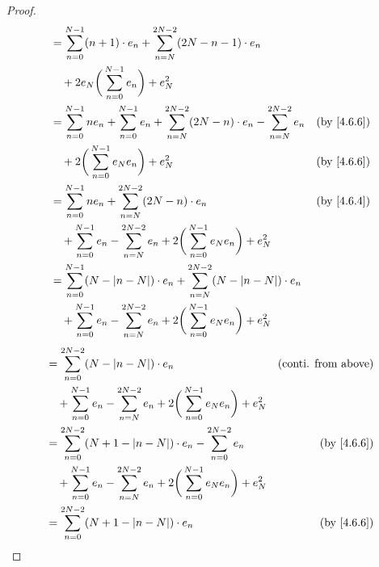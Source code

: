 \begin{proof}
\begin{align*}
     & = \sum_{n = 0}^{N - 1} (n + 1) \cdot e_n + \sum_{n = N}^{2N - 2} (2N - n - 1) \cdot e_n                                                                           \\
     & \quad + 2 e_N \bigg(\sum_{n = 0}^{N - 1} e_n\bigg) + e_N^2                                                                                                        \\
     & = \sum_{n = 0}^{N - 1} n e_n + \sum_{n = 0}^{N - 1} e_n + \sum_{n = N}^{2N - 2} (2N - n) \cdot e_n - \sum_{n = N}^{2N - 2} e_n & \text{(by \cref{4.6.6})}         \\
     & \quad + 2 \bigg(\sum_{n = 0}^{N - 1} e_N e_n\bigg) + e_N^2                                                                     & \text{(by \cref{4.6.6})}         \\
     & = \sum_{n = 0}^{N - 1} n e_n + \sum_{n = N}^{2N - 2} (2N - n) \cdot e_n                                                        & \text{(by \cref{4.6.4})}         \\
     & \quad + \sum_{n = 0}^{N - 1} e_n - \sum_{n = N}^{2N - 2} e_n + 2 \bigg(\sum_{n = 0}^{N - 1} e_N e_n\bigg) + e_N^2                                                 \\
     & = \sum_{n = 0}^{N - 1} (N - \abs{n - N}) \cdot e_n + \sum_{n = N}^{2N - 2} (N - \abs{n - N}) \cdot e_n                                                            \\
     & \quad + \sum_{n = 0}^{N - 1} e_n - \sum_{n = N}^{2N - 2} e_n + 2 \bigg(\sum_{n = 0}^{N - 1} e_N e_n\bigg) + e_N^2
  \end{align*}
  \begin{align*}
     & = \sum_{n = 0}^{2N - 2} (N - \abs{n - N}) \cdot e_n                                                               & \text{(conti. from above)}   \\
     & \quad + \sum_{n = 0}^{N - 1} e_n - \sum_{n = N}^{2N - 2} e_n + 2 \bigg(\sum_{n = 0}^{N - 1} e_N e_n\bigg) + e_N^2                                \\
     & = \sum_{n = 0}^{2N - 2} (N + 1 - \abs{n - N}) \cdot e_n - \sum_{n = 0}^{2N - 2} e_n                               & \text{(by \cref{4.6.6})}     \\
     & \quad + \sum_{n = 0}^{N - 1} e_n - \sum_{n = N}^{2N - 2} e_n + 2 \bigg(\sum_{n = 0}^{N - 1} e_N e_n\bigg) + e_N^2                                \\
     & = \sum_{n = 0}^{2N - 2} (N + 1 - \abs{n - N}) \cdot e_n                                                           & \text{(by \cref{4.6.6})}     \\

\end{align*}
\end{proof}

